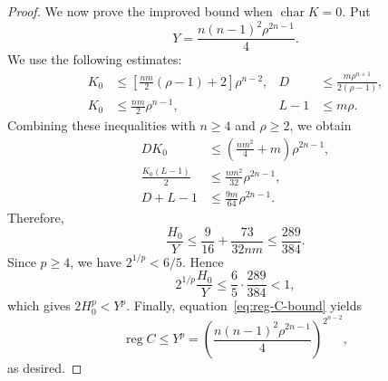 \documentclass[12pt]{amsart}
\numberwithin{equation}{section}
\theoremstyle{definition}
\theoremstyle{remark}
\numberwithin{equation}{section}
\DeclareMathOperator{\reg}{reg}
\begin{document}
\begin{proof}
We now prove the improved bound when $\operatorname{char}K=0$.
Put
\[
 Y=\frac{n(n-1)^2\rho^{2n-1}}4.
\]
We use the following estimates:
\[
 \begin{aligned}
 K_0&\le
 \left[\frac{nm}{2}(\rho-1)+2\right]\rho^{n-2},
 &D&\le\frac{m\rho^{n+1}}{2(\rho-1)},\\
 K_0&\le\frac{nm}{2}\rho^{n-1},
 &L-1&\le m\rho.
 \end{aligned}
\]
Combining these inequalities with $n\ge4$ and $\rho\ge2$, we obtain
\[
 \begin{aligned}
 DK_0&\le
 \left(\frac{nm^2}{4}+m\right)\rho^{2n-1},\\
 \frac{K_0(L-1)}2&\le
 \frac{nm^2}{32}\rho^{2n-1},\\
 D+L-1&\le
 \frac{9m}{64}\rho^{2n-1}.
 \end{aligned}
\]
Therefore,
\[
 \frac{H_0}{Y}
 \le\frac9{16}+\frac{73}{32nm}
 \le\frac{289}{384}.
\]
Since $p\ge4$, we have $2^{1/p}<6/5$. Hence
\[
 2^{1/p}\frac{H_0}{Y}
 \le\frac65\cdot\frac{289}{384}<1,
\]
which gives $2H_0^p<Y^p$.
Finally, equation~\eqref{eq:reg-C-bound} yields
\[
 \reg C\le Y^p
 =\left(\frac{n(n-1)^2\rho^{2n-1}}4\right)^{2^{n-2}},
\]
as desired.
\end{proof}
\end{document}

